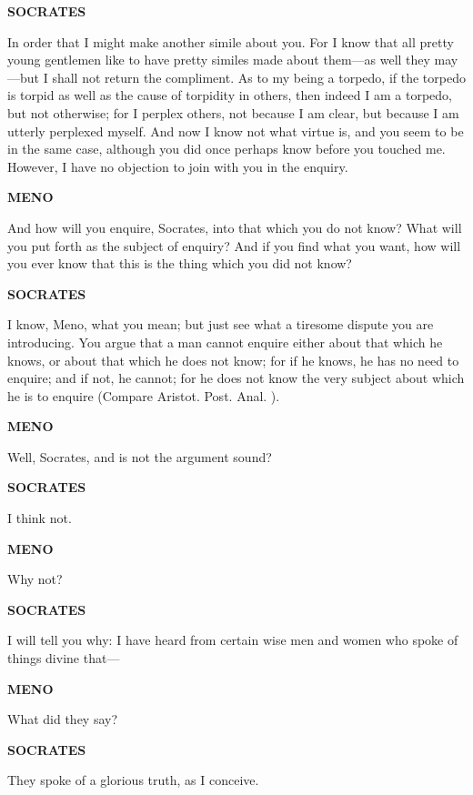 \documentclass[11pt,letter]{article}
\begin{document}
\par \textbf{SOCRATES}
\par   In order that I might make another simile about you. For I know that all pretty young gentlemen like to have pretty similes made about them—as well they may—but I shall not return the compliment. As to my being a torpedo, if the torpedo is torpid as well as the cause of torpidity in others, then indeed I am a torpedo, but not otherwise; for I perplex others, not because I am clear, but because I am utterly perplexed myself. And now I know not what virtue is, and you seem to be in the same case, although you did once perhaps know before you touched me. However, I have no objection to join with you in the enquiry.

\par \textbf{MENO}
\par   And how will you enquire, Socrates, into that which you do not know? What will you put forth as the subject of enquiry? And if you find what you want, how will you ever know that this is the thing which you did not know?

\par \textbf{SOCRATES}
\par   I know, Meno, what you mean; but just see what a tiresome dispute you are introducing. You argue that a man cannot enquire either about that which he knows, or about that which he does not know; for if he knows, he has no need to enquire; and if not, he cannot; for he does not know the very subject about which he is to enquire (Compare Aristot. Post. Anal. ).

\par \textbf{MENO}
\par   Well, Socrates, and is not the argument sound?

\par \textbf{SOCRATES}
\par   I think not.

\par \textbf{MENO}
\par   Why not?

\par \textbf{SOCRATES}
\par   I will tell you why:  I have heard from certain wise men and women who spoke of things divine that—

\par \textbf{MENO}
\par   What did they say?

\par \textbf{SOCRATES}
\par   They spoke of a glorious truth, as I conceive.
\end{document}
